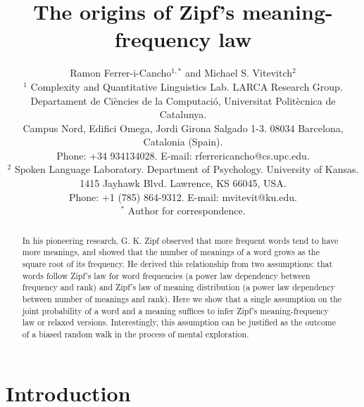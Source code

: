 \documentclass{article}
\begin{document}
\title{The origins of Zipf's meaning-frequency law}

\author{Ramon Ferrer-i-Cancho$^{1,*}$ and Michael S. Vitevitch$^2$\\
$^1$ {\small Complexity and Quantitative Linguistics Lab. LARCA Research Group. } \\ 
{\small Departament de Ci\`encies de la Computaci\'o, Universitat Polit\`ecnica de Catalunya. } \\
{\small Campus Nord, Edifici Omega, Jordi Girona Salgado 1-3. 08034 Barcelona, Catalonia (Spain). } \\ 
{\small Phone: +34 934134028. E-mail: rferrericancho@cs.upc.edu. } \\
$^2$ {\small Spoken Language Laboratory. Department of Psychology. University of Kansas. } \\ 
{\small 1415 Jayhawk Blvd. Lawrence, KS 66045, USA.} \\ 
{\small Phone: +1 (785) 864-9312. E-mail: mvitevit@ku.edu.} \\
$^*$ {\small Author for correspondence.}
}

\maketitle 

\begin{abstract}
In his pioneering research, G. K. Zipf observed that more frequent words tend to have more meanings, and showed that the number of meanings of a word grows as the square root of its frequency. He derived this relationship from two assumptions: that words follow Zipf's law for word frequencies (a power law dependency between frequency and rank) and Zipf's law of meaning distribution (a power law dependency between number of meanings and rank). Here we show that a single assumption on the joint probability of a word and a meaning suffices to infer Zipf's meaning-frequency law or relaxed versions. Interestingly, this assumption can be justified as the outcome of a biased random walk in the process of mental exploration.   
\end{abstract}

\section*{Introduction}

\end{document}
